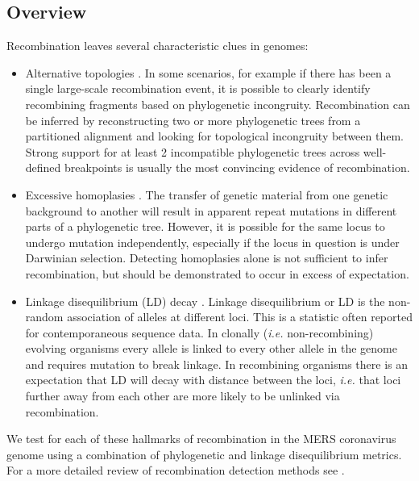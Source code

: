 \documentclass[11pt,oneside,letterpaper]{article}
\begin{document}
\subsection*{Overview}
Recombination leaves several characteristic clues in genomes:
\begin{itemize}
\item{Alternative topologies \citep{robertson_aids_1995,robertson_hiv_1995,holmes_1999}. 
In some scenarios, for example if there has been a single large-scale recombination event, it is possible to clearly identify recombining fragments based on phylogenetic incongruity.
Recombination can be inferred by reconstructing two or more phylogenetic trees from a partitioned alignment and looking for topological incongruity between them.
Strong support for at least 2 incompatible phylogenetic trees across well-defined breakpoints is usually the most convincing evidence of recombination.}
\item{Excessive homoplasies \citep{smith_1998}.
The transfer of genetic material from one genetic background to another will result in apparent repeat mutations in different parts of a phylogenetic tree.
However, it is possible for the same locus to undergo mutation independently, especially if the locus in question is under Darwinian selection.
Detecting homoplasies alone is not sufficient to infer recombination, but should be demonstrated to occur in excess of expectation.}
\item{Linkage disequilibrium (LD) decay \citep{meunier_2001}.
Linkage disequilibrium or LD is the non-random association of alleles at different loci.
This is a statistic often reported for contemporaneous sequence data.
In clonally (\textit{i.e.} non-recombining) evolving organisms every allele is linked to every other allele in the genome and requires mutation to break linkage.
In recombining organisms there is an expectation that LD will decay with distance between the loci, \textit{i.e.} that loci further away from each other are more likely to be unlinked via recombination.}
\end{itemize}
We test for each of these hallmarks of recombination in the MERS coronavirus genome using a combination of phylogenetic and linkage disequilibrium metrics.
For a more detailed review of recombination detection methods see \cite{posada_recombination_2002}.
\end{document}
